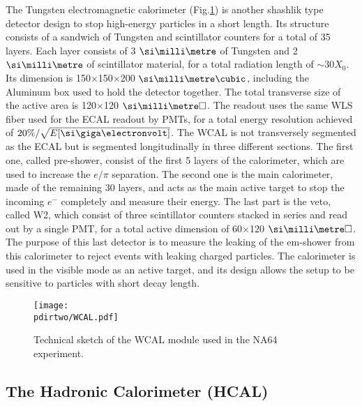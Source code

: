 The Tungsten electromagnetic calorimeter (Fig.\ref{fig:wcal-sketch}) is another shashlik type detector design to stop high-energy particles in a short length. Its structure consists of a sandwich of Tungsten and scintillator counters for a total of 35 layers. Each layer consists of 3 $\mmi$ of Tungsten and 2 $\mmi$ of scintillator material, for a total radiation length of $\sim$30$X_0$. Its dimension is 150$\times$150$\times$200 $\mmc$, including the Aluminum box used to hold the detector together. The total transverse size of the active area is 120$\times$120 $\mms$. The readout uses the same WLS fiber used for the ECAL readout by PMTs, for a total energy resolution achieved of $20\%/ \sqrt{E[\gev]}$. The WCAL is not transversely segmented as the ECAL but is segmented longitudinally in three different sections. The first one, called pre-shower, consist of the first 5 layers of the calorimeter, which are used to increase the $e/\pi$ separation. The second one is the main calorimeter, made of the remaining 30 layers, and acts as the main active target to stop the incoming $e^-$ completely and measure their energy. The last part is the veto, called W2, which consist of three scintillator counters stacked in series and read out by a single PMT, for a total active dimension of 60$\times$120 $\mms$. The purpose of this last detector is to measure the leaking of the em-shower from this calorimeter to reject events with leaking charged particles. The calorimeter is used in the visible mode as an active target, and its design allows the setup to be sensitive to particles with short decay length.

\begin{figure}[bth!]
\centering
\texttt{[image: \\pdirtwo/WCAL.pdf]}
\caption[WCAL sketch]{Technical sketch of the WCAL module used in the NA64 experiment.}
\label{fig:wcal-sketch}
\end{figure}


\subsection{The Hadronic Calorimeter (HCAL)}
\label{ch2:sec:detectors-hcal}

